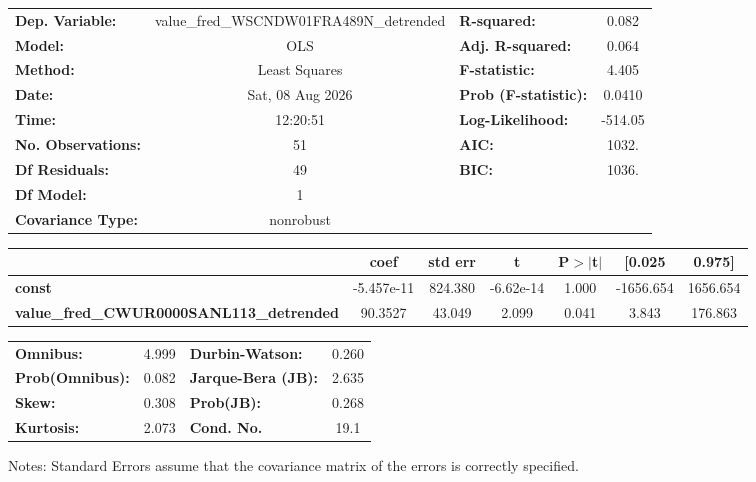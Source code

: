 \begin{center}
\begin{tabular}{lclc}
\toprule
\textbf{Dep. Variable:}                          & value\_fred\_WSCNDW01FRA489N\_detrended & \textbf{  R-squared:         } &     0.082   \\
\textbf{Model:}                                  &                   OLS                   & \textbf{  Adj. R-squared:    } &     0.064   \\
\textbf{Method:}                                 &              Least Squares              & \textbf{  F-statistic:       } &     4.405   \\
\textbf{Date:}                                   &             Sat, 08 Aug 2026            & \textbf{  Prob (F-statistic):} &   0.0410    \\
\textbf{Time:}                                   &                 12:20:51                & \textbf{  Log-Likelihood:    } &   -514.05   \\
\textbf{No. Observations:}                       &                      51                 & \textbf{  AIC:               } &     1032.   \\
\textbf{Df Residuals:}                           &                      49                 & \textbf{  BIC:               } &     1036.   \\
\textbf{Df Model:}                               &                       1                 & \textbf{                     } &             \\
\textbf{Covariance Type:}                        &                nonrobust                & \textbf{                     } &             \\
\bottomrule
\end{tabular}
\begin{tabular}{lcccccc}
                                                 & \textbf{coef} & \textbf{std err} & \textbf{t} & \textbf{P$> |$t$|$} & \textbf{[0.025} & \textbf{0.975]}  \\
\midrule
\textbf{const}                                   &   -5.457e-11  &      824.380     & -6.62e-14  &         1.000        &    -1656.654    &     1656.654     \\
\textbf{value\_fred\_CWUR0000SANL113\_detrended} &      90.3527  &       43.049     &     2.099  &         0.041        &        3.843    &      176.863     \\
\bottomrule
\end{tabular}
\begin{tabular}{lclc}
\textbf{Omnibus:}       &  4.999 & \textbf{  Durbin-Watson:     } &    0.260  \\
\textbf{Prob(Omnibus):} &  0.082 & \textbf{  Jarque-Bera (JB):  } &    2.635  \\
\textbf{Skew:}          &  0.308 & \textbf{  Prob(JB):          } &    0.268  \\
\textbf{Kurtosis:}      &  2.073 & \textbf{  Cond. No.          } &     19.1  \\
\bottomrule
\end{tabular}
\end{center}

Notes: \newline
 [1] Standard Errors assume that the covariance matrix of the errors is correctly specified.
